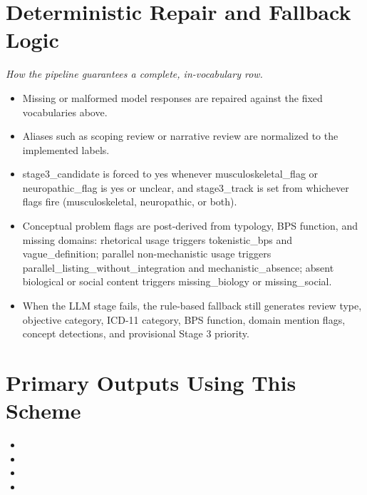 \documentclass[11pt]{article}
\begin{document}
\section*{Deterministic Repair and Fallback Logic}
{\small\itshape How the pipeline guarantees a complete, in-vocabulary row.}\par\smallskip
\begin{itemize}
\item Missing or malformed model responses are repaired against the fixed vocabularies above.
\item Aliases such as scoping review or narrative review are normalized to the implemented labels.
\item stage3\_candidate is forced to yes whenever musculoskeletal\_flag or neuropathic\_flag is yes or unclear, and stage3\_track is set from whichever flags fire (musculoskeletal, neuropathic, or both).
\item Conceptual problem flags are post-derived from typology, BPS function, and missing domains: rhetorical usage triggers tokenistic\_bps and vague\_definition; parallel non-mechanistic usage triggers parallel\_listing\_without\_integration and mechanistic\_absence; absent biological or social content triggers missing\_biology or missing\_social.
\item When the LLM stage fails, the rule-based fallback still generates review type, objective category, ICD-11 category, BPS function, domain mention flags, concept detections, and provisional Stage 3 priority.
\end{itemize}

\section*{Primary Outputs Using This Scheme}
\begin{itemize}
\item {}
\item {}
\item {}
\item {}
\end{itemize}
\end{document}
